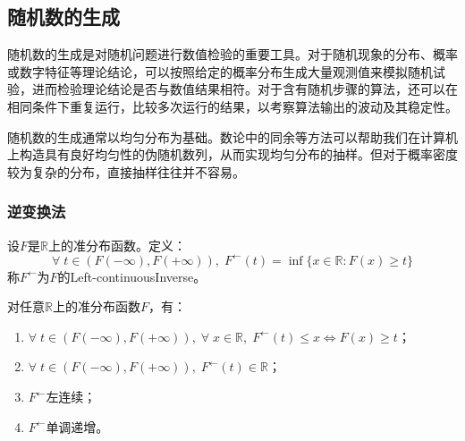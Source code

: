 \subsection{随机数的生成}
随机数的生成是对随机问题进行数值检验的重要工具。对于随机现象的分布、概率或数字特征等理论结论，可以按照给定的概率分布生成大量观测值来模拟随机试验，进而检验理论结论是否与数值结果相符。对于含有随机步骤的算法，还可以在相同条件下重复运行，比较多次运行的结果，以考察算法输出的波动及其稳定性。\par
随机数的生成通常以均匀分布为基础。数论中的同余等方法可以帮助我们在计算机上构造具有良好均匀性的伪随机数列，从而实现均匀分布的抽样。但对于概率密度较为复杂的分布，直接抽样往往并不容易。
\subsubsection{逆变换法}
\begin{definition}
	设$F$是$\mathbb{R}$上的准分布函数。定义：
	\begin{equation*}
		\forall\;t\in(F(-\infty),F(+\infty)),\;F^{\leftarrow}(t)=\inf\{x\in\mathbb{R}:F(x)\geqslant t\}
	\end{equation*}
	称$F^{\leftarrow}$为$F$的\gls{Left-continuousInverse}。
\end{definition}
\begin{property}\label{prop:LeftcontinuousInverse}
	对任意$\mathbb{R}$上的准分布函数$F$，有：
	\begin{enumerate}
		\item $\forall\;t\in(F(-\infty),F(+\infty)),\;\forall\;x\in\mathbb{R},\;F^{\leftarrow}(t)\leqslant x\Leftrightarrow F(x)\geqslant t$；
		\item $\forall\;t\in(F(-\infty),F(+\infty)),\;F^{\leftarrow}(t)\in\mathbb{R}$；
		\item $F^{\leftarrow}$左连续；
		\item $F^{\leftarrow}$单调递增。
	\end{enumerate}
\end{property}
